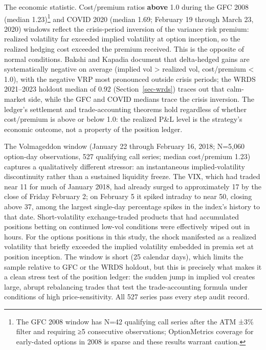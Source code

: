 \documentclass[
  11pt,
  letterpaper,
  DIV=12,
  numbers=noendperiod]{scrartcl}
\numberwithin{equation}{section}
\numberwithin{figure}{section}
\numberwithin{table}{section}
\begin{document}
The economic statistic. Cost/premium ratios \textbf{above} 1.0 during
the GFC 2008 (median 1.23)\footnote{The GFC 2008 window has N=42
  qualifying call series after the ATM ±3\% filter and requiring ≥5
  consecutive observations; OptionMetrics coverage for early-dated
  options in 2008 is sparse and these results warrant caution.} and
COVID 2020 (median 1.69; February 19 through March 23, 2020) windows
reflect the crisis-period inversion of the variance risk premium:
realized volatility far exceeded implied volatility at option inception,
so the realized hedging cost exceeded the premium received. This is the
opposite of normal conditions. Bakshi and Kapadia
 document that delta-hedged
gains are systematically negative on average (implied vol \textgreater{}
realized vol, cost/premium \textless{} 1.0), with the negative VRP most
pronounced outside crisis periods; the WRDS 2021--2023 holdout median of
0.92 (Section~\ref{sec-wrds}) traces out that calm-market side, while
the GFC and COVID medians trace the crisis inversion. The ledger's
settlement and trade-accounting theorems hold regardless of whether
cost/premium is above or below 1.0: the realized P\&L level is the
strategy's economic outcome, not a property of the position ledger.

The Volmageddon window (January 22 through February 16, 2018; N=5,060
option-day observations, 527 qualifying call series; median cost/premium
1.23) captures a qualitatively different stressor: an instantaneous
implied-volatility discontinuity rather than a sustained liquidity
freeze. The VIX, which had traded near 11 for much of January 2018, had
already surged to approximately 17 by the close of Friday February 2; on
February 5 it spiked intraday to near 50, closing above 37, among the
largest single-day percentage spikes in the index's history to that
date. Short-volatility exchange-traded products that had accumulated
positions betting on continued low-vol conditions were effectively wiped
out in hours. For the options positions in this study, the shock
manifested as a realized volatility that briefly exceeded the implied
volatility embedded in premia set at position inception. The window is
short (25 calendar days), which limits the sample relative to GFC or the
WRDS holdout, but this is precisely what makes it a clean stress test of
the position ledger: the sudden jump in implied vol creates large,
abrupt rebalancing trades that test the trade-accounting formula under
conditions of high price-sensitivity. All 527 series pass every step
audit record.
\end{document}
